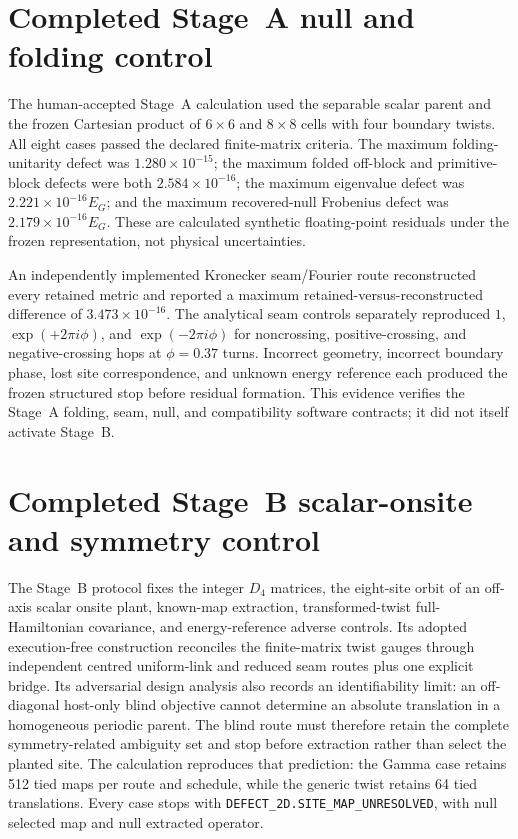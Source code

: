 \section{Completed Stage~A null and folding control}

The human-accepted Stage~A calculation used the separable scalar parent and the
frozen Cartesian product of $6\times6$ and $8\times8$ cells with four boundary twists. All eight
cases passed the declared finite-matrix criteria. The maximum folding-unitarity
defect was $1.280\times10^{-15}$; the maximum folded off-block and primitive-block
defects were both $2.584\times10^{-16}$; the maximum eigenvalue defect was
$2.221\times10^{-16}E_G$; and the maximum recovered-null Frobenius defect was
$2.179\times10^{-16}E_G$. These are calculated synthetic floating-point
residuals under the frozen representation, not physical uncertainties.

An independently implemented Kronecker seam/Fourier route reconstructed every
retained metric and reported a maximum retained-versus-reconstructed difference
of $3.473\times10^{-16}$. The analytical seam controls separately reproduced
$1$, $\exp(+2\pi i\phi)$, and $\exp(-2\pi i\phi)$ for noncrossing, positive-crossing,
and negative-crossing hops at $\phi=0.37$ turns. Incorrect geometry, incorrect
boundary phase, lost site correspondence, and unknown energy reference each
produced the frozen structured stop before residual formation. This evidence
verifies the Stage~A folding, seam, null, and compatibility software contracts;
it did not itself activate Stage~B.

\section{Completed Stage~B scalar-onsite and symmetry control}

The Stage~B protocol fixes the integer $D_4$ matrices, the eight-site orbit of
an off-axis scalar onsite plant, known-map extraction, transformed-twist
full-Hamiltonian covariance, and energy-reference adverse controls. Its adopted
execution-free construction reconciles the finite-matrix twist gauges through
independent centred uniform-link and reduced seam routes plus one explicit
bridge. Its adversarial design analysis also records an identifiability limit:
an off-diagonal host-only blind objective cannot determine an absolute
translation in a homogeneous periodic parent. The blind route must therefore
retain the complete symmetry-related ambiguity set and stop before extraction
rather than select the planted site. The calculation reproduces that prediction:
the Gamma case retains 512 tied maps per route and schedule, while the generic
twist retains 64 tied translations. Every case stops with
\texttt{DEFECT\_2D.SITE\_MAP\_UNRESOLVED}, with null selected map and null extracted
operator.

